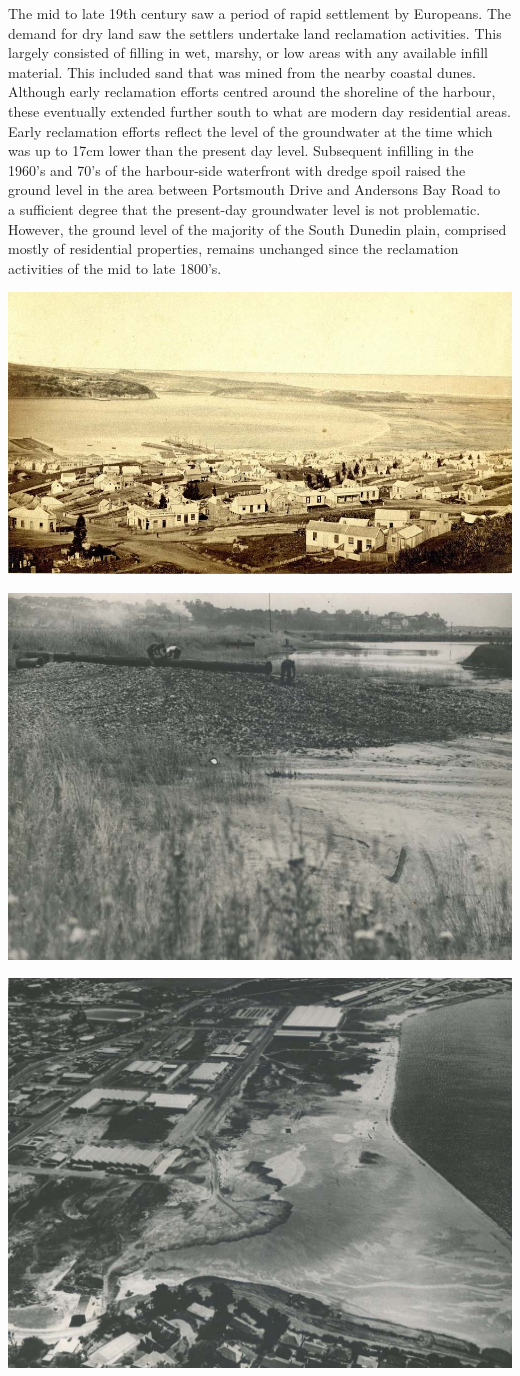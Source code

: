 \documentclass[]{article}
\begin{document}
The mid to late 19th century saw a period of rapid settlement by
Europeans. The demand for dry land saw the settlers undertake land
reclamation activities. This largely consisted of filling in wet,
marshy, or low areas with any available infill material. This included
sand that was mined from the nearby coastal dunes. Although early
reclamation efforts centred around the shoreline of the harbour, these
eventually extended further south to what are modern day residential
areas. Early reclamation efforts reflect the level of the groundwater at
the time which was up to 17cm lower than the present day level.
Subsequent infilling in the 1960's and 70's of the harbour-side
waterfront with dredge spoil raised the ground level in the area between
Portsmouth Drive and Andersons Bay Road to a sufficient degree that the
present-day groundwater level is not problematic. However, the ground
level of the majority of the South Dunedin plain, comprised mostly of
residential properties, remains unchanged since the reclamation
activities of the mid to late 1800's.

\begin{center}\includegraphics[width=0.5\linewidth]{../images/sd_historical_4} \end{center}

\begin{center}\includegraphics[width=0.5\linewidth]{../images/sd_historical_5} \end{center}

\begin{center}\includegraphics[width=0.5\linewidth]{../images/sd_historical_6} \end{center}
\end{document}
